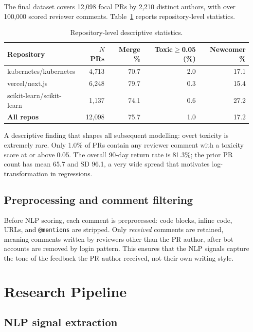 \documentclass[12pt,a4paper]{article}
\begin{document}
The final dataset covers 12,098 focal PRs by 2,210 distinct authors, with over 100,000 scored reviewer comments. Table~\ref{tab:desc} reports repository-level statistics.

\begin{table}[h]
\centering
\caption{Repository-level descriptive statistics.}
\label{tab:desc}
\small
\begin{tabular}{lrrrr}
\toprule
\textbf{Repository} & \textbf{$N$ PRs} & \textbf{Merge \%} & \textbf{Toxic$\geq$0.05 (\%)} & \textbf{Newcomer \%} \\
\midrule
kubernetes/kubernetes     & 4{,}713 & 70.7 & 2.0 & 17.1 \\
vercel/next.js            & 6{,}248 & 79.7 & 0.3 & 15.4 \\
scikit-learn/scikit-learn & 1{,}137 & 74.1 & 0.6 & 27.2 \\
\midrule
\textbf{All repos}        & 12{,}098 & 75.7 & 1.0 & 17.2 \\
\bottomrule
\end{tabular}
\end{table}

A descriptive finding that shapes all subsequent modelling: overt toxicity is extremely rare. Only 1.0\% of PRs contain any reviewer comment with a toxicity score at or above 0.05. The overall 90-day return rate is 81.3\%; the prior PR count has mean 65.7 and SD 96.1, a very wide spread that motivates log-transformation in regressions.

\subsection{Preprocessing and comment filtering}

Before NLP scoring, each comment is preprocessed: code blocks, inline code, URLs, and \texttt{@mentions} are stripped. Only \emph{received} comments are retained, meaning comments written by reviewers other than the PR author, after bot accounts are removed by login pattern. This ensures that the NLP signals capture the tone of the feedback the PR author received, not their own writing style.

\section{Research Pipeline}

\subsection{NLP signal extraction}
\end{document}
